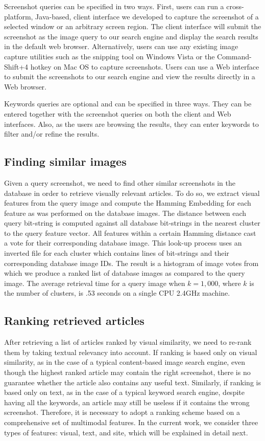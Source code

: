 \documentclass{www2010-submission}
\begin{document}
Screenshot queries can be specified in two ways. First, users can
run a cross-platform, Java-based, client interface we developed to
capture the screenshot of a selected window or an arbitrary screen
region. The client interface will submit the screenshot as the
image query to our search engine and display the search results in the
default web browser. Alternatively, users can use any existing
image capture utilities such as the snipping tool on Windows Vista
or the Command-Shift+4 hotkey on Mac OS to capture screenshots.
Users can use a Web interface to submit the screenshots to our search
engine and view the results directly in a Web browser.

Keywords queries are optional and can be specified in three ways.
They can be entered together with the screenshot queries on both
the client and Web interfaces. Also, as the users are browsing the
results, they can enter keywords to filter and/or refine the
results.

\subsection{Finding similar images}
\label{sec:finding_similar_images}

Given a query screenshot, we need to find other similar screenshots in
the database in order to retrieve visually relevant articles.  To do
so, we extract visual features from the query image and compute the Hamming
Embedding for each feature as was performed on the database images.
The distance between each query bit-string is computed against all
database bit-strings in the nearest cluster to the query feature
vector.  All features within a certain Hamming distance cast a vote
for their corresponding database image.  This look-up process uses an
inverted file for each cluster which contains lines of bit-strings and
their corresponding database image IDs.  The result is a histogram of
image votes from which we produce a ranked list of database images as
compared to the query image. The average retrieval time for a query
image when $k=1,000$, where $k$ is the number of clusters, is .53
seconds on a single CPU 2.4GHz machine.

\subsection{Ranking retrieved articles}
\label{sec:ranking_retrieved_articles}

After retrieving a list of articles ranked by visual similarity, we
need to re-rank them by taking textual relevancy into account.  If
ranking is based only on visual similarity, as in the case of a
typical content-based image search engine, even though the highest
ranked article may contain the right screenshot, there is no guarantee
whether the article also contains any useful text. Similarly, if
ranking is based only on text, as in the case of a typical keyword
search engine, despite having all the keywords, an article may still
be useless if it contains the wrong screenshot. Therefore, it is
necessary to adopt a ranking scheme based on a comprehensive set of
multimodal features. In the current work, we consider three types of
features: visual, text, and site, which will be explained in detail
next.
\end{document}
